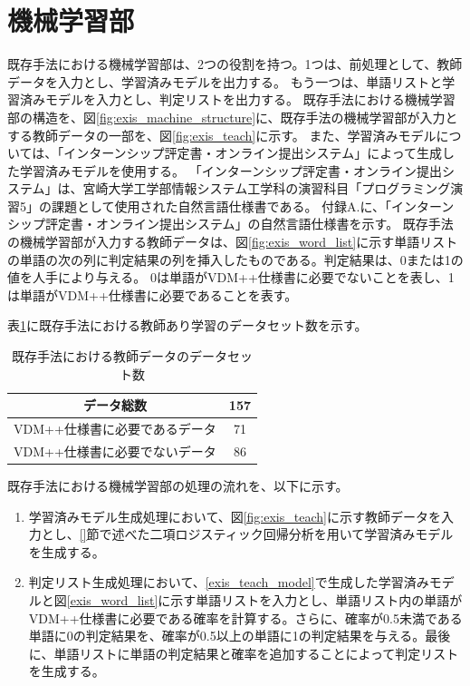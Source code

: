 \section{機械学習部}
\label{sec:exis_machine}
既存手法における機械学習部は、2つの役割を持つ。1つは、前処理として、教師データを入力とし、学習済みモデルを出力する。
もう一つは、単語リストと学習済みモデルを入力とし、判定リストを出力する。
既存手法における機械学習部の構造を、図\ref{fig:exis_machine_structure}に、既存手法の機械学習部が入力とする教師データの一部を、図\ref{fig:exis_teach}に示す。
また、学習済みモデルについては、「インターンシップ評定書・オンライン提出システム」によって生成した学習済みモデルを使用する。
「インターンシップ評定書・オンライン提出システム」は、宮崎大学工学部情報システム工学科の演習科目「プログラミング演習5」の課題として使用された自然言語仕様書である。
付録A.に、「インターンシップ評定書・オンライン提出システム」の自然言語仕様書を示す。
既存手法の機械学習部が入力する教師データは、図\ref{fig:exis_word_list}に示す単語リストの単語の次の列に判定結果の列を挿入したものである。判定結果は、0または1の値を人手により与える。
0は単語がVDM++仕様書に必要でないことを表し、1は単語がVDM++仕様書に必要であることを表す。

表\ref{table:exis_data_set}に既存手法における教師あり学習のデータセット数を示す。

\begin{table}[t]
    \begin{center}
      \caption{既存手法における教師データのデータセット数}
      \label{table:exis_data_set}
      \begin{tabular}{c|c}
        データ総数　& 157\\
        \hline
        \hline
        VDM++仕様書に必要であるデータ    & 71\\ \hline
        VDM++仕様書に必要でないデータ & 86\\ \hline
      \end{tabular}
    \end{center}
  \end{table}

既存手法における機械学習部の処理の流れを、以下に示す。

\begin{enumerate}
    \item 学習済みモデル生成処理において、図\ref{fig:exis_teach}に示す教師データを入力とし、\ref{}節で述べた二項ロジスティック回帰分析を用いて学習済みモデルを生成する。
    \label{exis_teach_model}
    \item 判定リスト生成処理において、\ref{exis_teach_model}で生成した学習済みモデルと図\ref{exis_word_list}に示す単語リストを入力とし、単語リスト内の単語がVDM++仕様書に必要である確率を計算する。さらに、確率が0.5未満である単語に0の判定結果を、確率が0.5以上の単語に1の判定結果を与える。最後に、単語リストに単語の判定結果と確率を追加することによって判定リストを生成する。
\end{enumerate}

